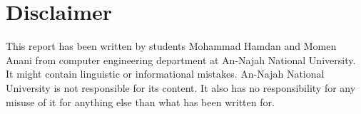 \documentclass[a4paper,11pt,oneside]{book}
\begin{document}

   
       

         
    
    
    
    \chapter*{Disclaimer}
    This report has been written by students Mohammad Hamdan and Momen Anani from computer engineering department at An-Najah National University. It might contain linguistic or informational mistakes. An-Najah National University is not responsible for its content. It also has no responsibility for any misuse of it for anything else than what has been written for.

    \tableofcontents
    \listoffigures
    \listoftables



    
    
    \mainmatter
    
    
    
    
    
    
\end{document}
